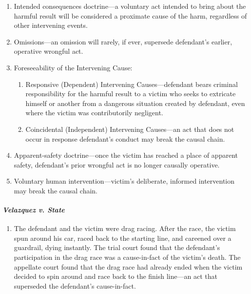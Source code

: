 \begin{enumerate}
\begin{enumerate}
        \item Intended consequences doctrine---a voluntary act intended to bring about the harmful result will be considered a proximate cause of the harm, regardless of other intervening events.
        \item Omissions---an omission will rarely, if ever, supersede defendant's earlier, operative wrongful act.
        \item Foreseeability of the Intervening Cause:
        \begin{enumerate}
            \item Responsive (Dependent) Intervening Causes---defendant bears criminal responsibility for the harmful result to a victim who seeks to extricate himself or another from a dangerous situation created by defendant, even where the victim was contributorily negligent.
            \item Coincidental (Independent) Intervening Causes---an act that does not occur in response defendant's conduct may break the causal chain.
        \end{enumerate}
        \item Apparent-safety doctrine---once the victim has reached a place of apparent safety, defendant's prior wrongful act is no longer causally operative.
        \item Voluntary human intervention---victim's deliberate, informed intervention may break the causal chain.
    \end{enumerate}
\end{enumerate}

\paragraph{\emph{Velazquez v. State}}

\begin{enumerate}
    \item The defendant and the victim were drag racing. After the race, the victim spun around his car, raced back to the starting line, and careened over a guardrail, dying instantly. The trial court found that the defendant's participation in the drag race was a cause-in-fact of the victim's death. The appellate court found that the drag race had already ended when the victim decided to spin around and race back to the finish line---an act that superseded the defendant's cause-in-fact.
\end{enumerate}
